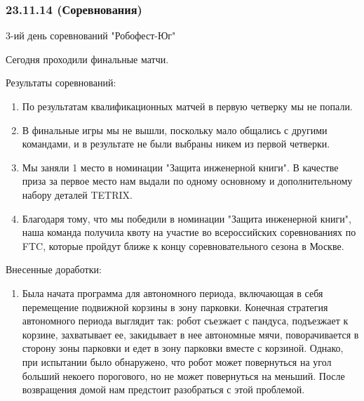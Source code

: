 \subsubsection{23.11.14 (Соревнования)}
\begin{center}
	3-ий день соревнований "Робофест-Юг"
\end{center}
Сегодня проходили финальные матчи.

Результаты соревнований:
\begin{enumerate}
	\item По результатам квалификационных матчей в первую четверку мы не попали.
	
	\item В финальные игры мы не вышли, поскольку мало общались с другими командами, и в результате не были выбраны никем из первой четверки.
	
	\item Мы заняли 1 место в номинации "Защита инженерной книги". В качестве приза за первое место нам выдали по одному основному и дополнительному набору деталей TETRIX.
	
	\item Благодаря тому, что мы победили в номинации "Защита инженерной книги", наша команда получила квоту на участие во всероссийских соревнованиях по FTC, которые пройдут ближе к концу соревновательного сезона в Москве.
	
\end{enumerate}

Внесенные доработки:
\begin{enumerate}
	\item Была начата программа для автономного периода, включающая в себя перемещение подвижной корзины в зону парковки. Конечная стратегия автономного периода выглядит так: робот съезжает с пандуса, подъезжает к корзине, захватывает ее, закидывает в нее автономные мячи, поворачивается в сторону зоны парковки и едет в зону парковки вместе с корзиной. Однако, при испытании было обнаружено, что робот может повернуться на угол больший некоего порогового, но не может повернуться на меньший. После возвращения домой нам предстоит разобраться с этой проблемой.
\end{enumerate}

